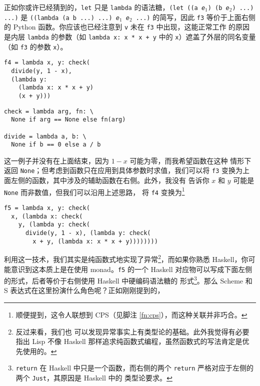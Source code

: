 正如你或许已经猜到的，\verb|let| 只是 \verb|lambda| 的语法糖，\texttt{(let
((a \emph{e$_1$}) (b \emph{e$_2$}) ...) ...)} 是 \texttt{((lambda (a b ...)
...) \emph{e$_1$} \emph{e$_2$} ...)} 的简写，因此 \verb|f3| 等价于上面右侧的
Python 函数。你应该也已经注意到 \verb|v| 未在 \verb|f3| 中出现，这能正常工作
的原因是内层 \verb|lambda| 的参数（如 \texttt{lambda x: x * x + y} 中的
\verb|x|）遮盖了外层的同名变量（如 \verb|f3| 的参数 \verb|x|）。

\colskipa\begin{multicols}{2}
\begin{wquoting}
\begin{Verbatim}
f4 = lambda x, y: check(
  divide(y, 1 - x),
  (lambda y:
    (lambda x: x * x + y)
    (x + y)))
\end{Verbatim}
\end{wquoting}
\begin{wquoting}
\begin{Verbatim}
check = lambda arg, fn: \
  None if arg == None else fn(arg)

divide = lambda a, b: \
  None if b == 0 else a / b
\end{Verbatim}
\end{wquoting}
\end{multicols}\colskipb
这一例子并没有在上面结束，因为 $1 - x$ 可能为零，而我希望函数在这种
情形下返回 \verb|None|；但考虑到函数只在应用到具体参数时求值，我们可以将
\verb|f3| 变换为上面左侧的函数，其中涉及的辅助函数在右侧。此外，我没有
告诉你 $x$ 和 $y$ 可能是 \verb|None| 而非数值，但我们可以沿用上述思路，
将 \verb|f4| 变换为\footnote{顺便提到，这令人联想到 CPS（见脚注
\ref{fn:cps}），而这种关联并非巧合\cupercite{troelskn2009}。}
\begin{wquoting}
\begin{Verbatim}
f5 = lambda x, y: check(
  x, (lambda x: check(
    y, (lambda y: check(
      divide(y, 1 - x), (lambda y: check(
        x + y, (lambda x: x * x + y))))))))
\end{Verbatim}
\end{wquoting}
利用这一技术，我们其实是纯函数式地实现了异常\footnote{反过来看，我们也
可以发现异常事实上有类型论的基础。此外我觉得有必要指出 Lisp 不像 Haskell
那样追求纯函数式编程，虽然函数式的写法肯定是优先使用的。}，而如果你熟悉
Haskell，你可能意识到这本质上是在使用 monad。\verb|f5| 的一个 Haskell
对应物可以写成下面左侧的形式，后者等价于右侧使用 Haskell 中硬编码语法糖的
形式\footnote{\texttt{return} 在 Haskell 中只是一个函数，而右侧的两个
\texttt{return} 严格对应于左侧的两个 \texttt{Just}，其原因是 Haskell 中的
类型论要求。}。那么 Scheme 和 S 表达式在这里扮演什么角色呢？正如刚刚提到的，
